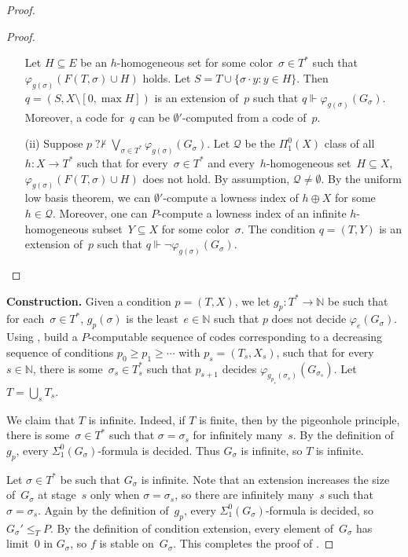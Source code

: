\documentclass[10pt,a4paper]{amsart}
\def\Q{\mathcal{Q}}
\newcommand{\NN}[0]{\mathbb{N}}
\newcommand{\nqvdash}{\operatorname{{?}{\nvdash}}}
\begin{document}
\begin{proof}
\begin{proof}
\begin{itemize}
    Let $H \subseteq E$ be an $h$-homogeneous set for some color~$\sigma \in T^*$ such that $\varphi_{g(\sigma)}(F(T, \sigma) \cup H)$ holds. Let $S = T \cup \{ \sigma \cdot y : y \in H \}$. Then $q = (S, X \setminus [0, \max H])$ is an extension of~$p$ such that $q \Vdash \varphi_{g(\sigma)}(G_\sigma)$. Moreover, a code for~$q$ can be $\emptyset'$-computed from a code of~$p$.
    
    \item[(ii)] Suppose $p \nqvdash \bigvee_{\sigma \in T^*} \varphi_{g(\sigma)}(G_\sigma)$. Let $\Q$ be the $\Pi^0_1(X)$ class of all $h : X \to T^*$ such that for every~$\sigma \in T^*$ and every~$h$-homogeneous set~$H \subseteq X$, $\varphi_{g(\sigma)}(F(T, \sigma) \cup H)$ does not hold. By assumption, $\Q \neq \emptyset$. By the uniform low basis theorem, we can $\emptyset'$-compute a lowness index of $h \oplus X$ for some~$h \in \Q$. Moreover, one can $P$-compute a lowness index of an infinite $h$-homogeneous subset~$Y \subseteq X$ for some color~$\sigma$. The condition $q = (T, Y)$ is an extension of~$p$ such that $q \Vdash \neg \varphi_{g(\sigma)}(G_\sigma)$.
\end{itemize}
\end{proof}
\bigskip

\noindent
\textbf{Construction.}
Given a condition $p = (T, X)$, we let $g_p : T^* \to \NN$ be such that for each~$\sigma \in T^*$, $g_p(\sigma)$ is the least~$e \in \NN$ such that $p$ does not decide $\varphi_e(G_\sigma)$. Using , build a $P$-computable sequence of codes corresponding to a decreasing sequence of conditions $p_0 \geq p_1 \geq \cdots$ with $p_s = (T_s, X_s)$, such that for every~$s \in \NN$, there is some~$\sigma_s \in T_s^*$ such that $p_{s+1}$ decides $\varphi_{g_{p_s}(\sigma_s)}(G_{\sigma_s})$. Let $T  = \bigcup_s T_s$. 

We claim that $T$ is infinite. Indeed, if $T$ is finite, then by the pigeonhole principle, there is some~$\sigma \in T^*$ such that $\sigma = \sigma_s$ for infinitely many~$s$. By the definition of $g_p$, every $\Sigma^0_1(G_\sigma)$-formula is decided.  Thus $G_\sigma$ is infinite, so $T$ is infinite. 

Let $\sigma \in T^*$ be such that $G_\sigma$ is infinite. Note that an extension increases the size of~$G_\sigma$ at stage~$s$ only when $\sigma = \sigma_s$, so there are infinitely many~$s$ such that $\sigma = \sigma_s$. Again by the definition of~$g_p$, every $\Sigma^0_1(G_\sigma)$-formula is decided, so $G_\sigma' \leq_T P$. By the definition of condition extension, every element of~$G_\sigma$ has limit~0 in $G_\sigma$, so $f$ is stable on~$G_\sigma$.
This completes the proof of .
\end{proof}
\end{document}
